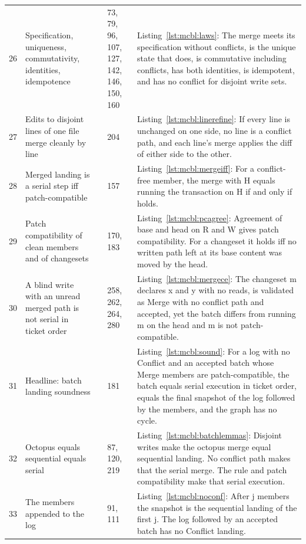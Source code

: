 \documentclass[11pt,letterpaper]{article}
\theoremstyle{definition}
\theoremstyle{remark}
\begin{document}
\begin{small}
\begin{longtable}{@{}L{0.8cm}L{3.4cm}L{3.6cm}L{1.3cm}L{5.4cm}@{}}
26 & Specification, uniqueness, commutativity, identities, idempotence &  & 73, 79, 96, 107, 127, 142, 146, 150, 160 & Listing~\ref{lst:mcbl:laws}: The merge meets its specification without conflicts, is the unique state that does, is commutative including conflicts, has both identities, is idempotent, and has no conflict for disjoint write sets. \\
27 & Edits to disjoint lines of one file merge cleanly by line &  & 204 & Listing~\ref{lst:mcbl:linerefine}: If every line is unchanged on one side, no line is a conflict path, and each line's merge applies the diff of either side to the other. \\
28 & Merged landing is a serial step iff patch-compatible &  & 157 & Listing~\ref{lst:mcbl:mergeiff}: For a conflict-free member, the merge with H equals running the transaction on H if and only if  holds. \\
29 & Patch compatibility of clean members and of changesets &  & 170, 183 & Listing~\ref{lst:mcbl:pcagree}: Agreement of base and head on R and W gives patch compatibility. For a changeset it holds iff no written path left at its base content was moved by the head. \\
30 & A blind write with an unread merged path is not serial in ticket order &  & 258, 262, 264, 280 & Listing~\ref{lst:mcbl:mergece}: The changeset m declares x and y with no reads, is validated as Merge with no conflict path and accepted, yet the batch differs from running m on the head and m is not patch-compatible. \\
31 & Headline: batch landing soundness &  & 181 & Listing~\ref{lst:mcbl:sound}: For a log with no Conflict and an accepted batch whose Merge members are patch-compatible, the batch equals serial execution in ticket order, equals the final snapshot of the log followed by the members, and the graph has no cycle. \\
32 & Octopus equals sequential equals serial &  & 87, 120, 219 & Listing~\ref{lst:mcbl:batchlemmas}: Disjoint writes make the octopus merge equal sequential landing. No conflict path makes that the serial merge. The rule and patch compatibility make that serial execution. \\
33 & The members appended to the log &  & 91, 111 & Listing~\ref{lst:mcbl:noconf}: After j members the snapshot is the sequential landing of the first j. The log followed by an accepted batch has no Conflict landing. \\

\end{longtable}
\end{small}
\end{document}
